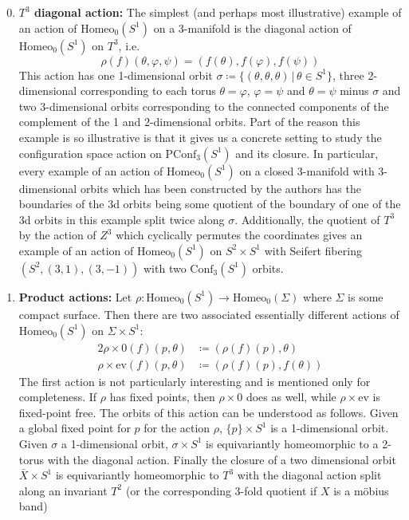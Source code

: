 \documentclass[10pt, oneside]{article}
\newcommand{\homeo}[1][S^1]{\text{Homeo}_0(#1)}
\newcommand{\conf}[2][S^1]{\text{Conf}_{#2}(#1)}
\newcommand{\pconf}[2][S^1]{\text{PConf}_{#2}(#1)}
\theoremstyle{definition}
\theoremstyle{definition}
\begin{document}
\begin{enumerate}
    \setcounter{enumi}{-1}
    \item {\bf $T^3$ diagonal action:} The simplest (and perhaps most illustrative) example of an action of $\homeo$ on a 3-manifold is the diagonal action of $\homeo$ on $T^3$, i.e.$$\rho(f)(\theta, \varphi, \psi) = (f(\theta), f(\varphi), f(\psi))$$ This action has one 1-dimensional orbit $\sigma \coloneqq \{(\theta,\theta,\theta)\,\vert\,\theta\in S^1\}$, three 2-dimensional corresponding to each torus $\theta=\varphi$, $\varphi=\psi$ and $\theta=\psi$ minus $\sigma$ and two 3-dimensional orbits corresponding to the connected components of the complement of the 1 and 2-dimensional orbits. Part of the reason this example is so illustrative is that it gives us a concrete setting to study the configuration space action on $\pconf{3}$ and its closure. In particular, every example of an action of $\homeo$ on a closed 3-manifold with 3-dimensional orbits which has been constructed by the authors has the boundaries of the 3d orbits being some quotient of the boundary of one of the 3d orbits in this example split twice along $\sigma$. Additionally, the quotient of $T^3$ by the action of $Z^3$ which cyclically permutes the coordinates gives an example of an action of $\homeo$ on $S^2\times S^1$ with Seifert fibering $(S^2, (3, 1), (3, -1))$ with two $\conf{3}$ orbits.
    
        
    \item {\bf Product actions:} Let $\rho:\homeo[S^1]\to\homeo[\Sigma]$ where $\Sigma$ is some compact surface. Then there are two associated essentially different actions of $\homeo[S^1]$ on $\Sigma\times S^1$:
    \begin{alignat*}{2}
        \rho\times 0(f)(p, \theta) &\coloneqq (\rho(f)(p), \theta) \\
        \rho\times \text{ev}(f)(p, \theta) &\coloneqq (\rho(f)(p), f(\theta))
    \end{alignat*}
    The first action is not particularly interesting and is mentioned only for completeness. If $\rho$ has fixed points, then $\rho\times 0$ does as well, while $\rho\times \text{ev}$ is fixed-point free. The orbits of this action can be understood as follows. Given a global fixed point for $p$ for the action $\rho$, $\{p\}\times S^1$ is a 1-dimensional orbit. Given $\sigma$ a 1-dimensional orbit, $\sigma\times S^1$ is equivariantly homeomorphic to a 2-torus with the diagonal action. Finally the closure of a two dimensional orbit $\bar{X}\times S^1$ is equivariantly homeomorphic to $T^3$ with the diagonal action split along an invariant $T^2$ (or the corresponding 3-fold quotient if $X$ is a m\"{o}bius band)
\end{enumerate}
\end{document}
